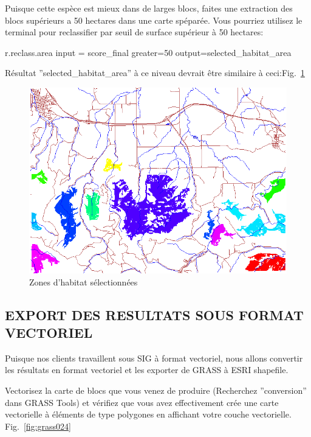 Puisque cette esp\`ece est mieux dans de larges blocs, faites une extraction des blocs sup\'erieurs a 50 hectares dans une carte sp\'epar\'ee. Vous pourriez utilisez le terminal pour reclassifier par seuil de surface sup\'erieur \`a 50 hectares:

\begin{smallverbatim}
r.reclass.area input = score_final greater=50 
 output=selected_habitat_area
\end{smallverbatim}

R\'esultat ''selected\_habitat\_area'' \`a ce niveau devrait \^etre similaire \`a ceci:Fig.~\ref{fig:grass023}

\begin{figure}[htbp]
   \centering
   \includegraphics[scale=0.35]{grass023.png}
   \caption{Zones d'habitat s\'electionn\'ees}
   \label{fig:grass023}
\end{figure}

\subsection{EXPORT DES RESULTATS SOUS FORMAT VECTORIEL}
Puisque nos clients travaillent sous SIG \`a format vectoriel, nous allons convertir les r\'esultats en format vectoriel et les exporter de GRASS \`a ESRI shapefile.

Vectorisez la carte de blocs que vous venez de produire (Recherchez ''conversion'' dans GRASS Tools) et v\'erifiez que vous avez effectivement cr\'ee une carte vectorielle \`a \'el\'ements de type polygones en affichant votre couche vectorielle. Fig.~\ref{fig:grass024}

